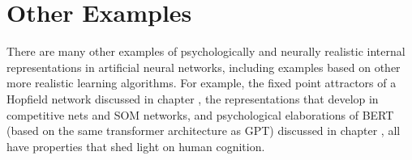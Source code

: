 
\section{Other Examples}

There are many other examples of psychologically and neurally realistic internal representations  in artificial neural networks, including examples based on other more realistic learning algorithms. For example, the fixed point attractors of a Hopfield network discussed in chapter , the representations that develop in competitive nets and SOM networks, and psychological elaborations of BERT  (based on the same transformer architecture as GPT) discussed in chapter , all have properties that shed light on human cognition. 



